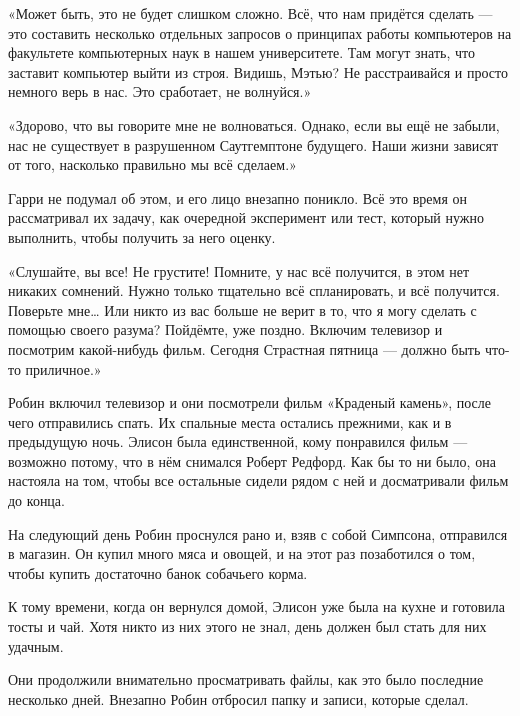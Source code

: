 \documentclass[a4paper,12pt]{book}
\begin{document}
\par
«Может быть, это не будет слишком сложно. Всё, что нам придётся сделать — это составить несколько отдельных запросов о принципах работы компьютеров на факультете компьютерных наук в нашем университете. Там могут знать, что заставит компьютер выйти из строя. Видишь, Мэтью? Не расстраивайся и просто немного верь в нас. Это сработает, не волнуйся.»
\par
«Здорово, что вы говорите мне не волноваться. Однако, если вы ещё не забыли, нас не существует в разрушенном Саутгемптоне будущего. Наши жизни зависят от того, насколько правильно мы всё сделаем.»
\par
Гарри не подумал об этом, и его лицо внезапно поникло. Всё это время он рассматривал их задачу, как очередной эксперимент или тест, который нужно выполнить, чтобы получить за него оценку.
\par
«Слушайте, вы все! Не грустите! Помните, у нас всё получится, в этом нет никаких сомнений. Нужно только тщательно всё спланировать, и всё получится. Поверьте мне… Или никто из вас больше не верит в то, что я могу сделать с помощью своего разума? Пойдёмте, уже поздно. Включим телевизор и посмотрим какой-нибудь фильм. Сегодня Страстная пятница — должно быть что-то приличное.»\\
\par
Робин включил телевизор и они посмотрели фильм «Краденый камень», после чего отправились спать. Их спальные места остались прежними, как и в предыдущую ночь. Элисон была единственной, кому понравился фильм — возможно потому, что в нём снимался Роберт Редфорд. Как бы то ни было, она настояла на том, чтобы все остальные сидели рядом с ней и досматривали фильм до конца.\\
\par
На следующий день Робин проснулся рано и, взяв с собой Симпсона, отправился в магазин. Он купил много мяса и овощей, и на этот раз позаботился о том, чтобы купить достаточно банок собачьего корма.
\par
К тому времени, когда он вернулся домой, Элисон уже была на кухне и готовила тосты и чай. Хотя никто из них этого не знал, день должен был стать для них удачным.\\
\par
Они продолжили внимательно просматривать файлы, как это было последние несколько дней. Внезапно Робин отбросил папку и записи, которые сделал.
\end{document}
